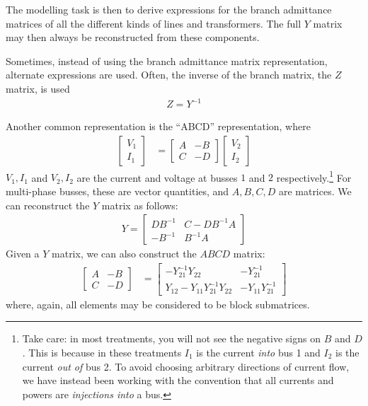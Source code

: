 \documentclass[11pt]{article}
\begin{document}
The modelling task is then to derive expressions for the branch admittance matrices of all the different kinds of lines and transformers. The full $Y$ matrix may then always be reconstructed from these components. 

Sometimes, instead of using the branch admittance matrix representation, alternate expressions are used. Often, the inverse of the branch matrix, the $Z$ matrix, is used
\begin{align}
	Z = Y^{-1}
\end{align}

Another common representation is the ``ABCD'' representation, where
\begin{align}
	\begin{bmatrix}
		V_1 \\ I_1
	\end{bmatrix} &= \begin{bmatrix}
		A & -B \\ C & -D
	\end{bmatrix}\begin{bmatrix}
		V_2 \\ I_2
	\end{bmatrix}
\end{align}
$V_1, I_1$ and $V_2, I_2$ are the current and voltage at busses $1$ and $2$ respectively.\footnote{Take care: in most treatments, you will not see the negative signs on $B$ and $D$. This is because in these treatments $I_1$ is the current \emph{into} bus 1 and $I_2$ is the current \emph{out of} bus 2. To avoid choosing arbitrary directions of current flow, we have instead been working with the convention that all currents and powers are \emph{injections into} a bus.} For multi-phase busses, these are vector quantities, and $A, B, C, D$ are matrices. We can reconstruct the $Y$ matrix as follows:
\begin{align}
	Y = \begin{bmatrix}
		DB^{-1} & C - DB^{-1}A \\
		-B^{-1} & B^{-1}A
	\end{bmatrix}
\end{align}
Given a $Y$ matrix, we can also construct the $ABCD$ matrix:
\begin{align}
	\begin{bmatrix} A & -B \\ C & -D \end{bmatrix} &=
	\begin{bmatrix}
		-Y_{21}^{-1}Y_{22} & -Y_{21}^{-1} \\
		Y_{12} - Y_{11}Y_{21}^{-1}Y_{22} & -Y_{11}Y_{21}^{-1}
	\end{bmatrix}
\end{align}
where, again, all elements may be considered to be block submatrices.
\end{document}
